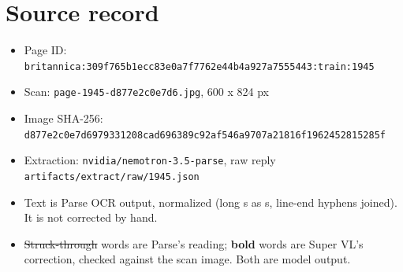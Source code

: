 \documentclass[10pt]{article}
\begin{document}
\section*{Source record}
\begin{itemize}
\item Page ID: \texttt{britannica:309f765b1ecc83e0a7f7762e44b4a927a7555443:train:1945}
\item Scan: \texttt{page-1945-d877e2c0e7d6.jpg}, 600 x 824 px
\item Image SHA-256: \texttt{\small d877e2c0e7d6979331208cad696389c92af546a9707a21816f1962452815285f}
\item Extraction: \texttt{nvidia/nemotron-3.5-parse}, raw reply \texttt{artifacts/extract/raw/1945.json}
\item Text is Parse OCR output, normalized (long s as s, line-end hyphens joined). It is not corrected by hand.
\item \sout{Struck-through} words are Parse's reading; \textbf{bold} words are Super VL's correction, checked against the scan image. Both are model output.
\end{itemize}
\end{document}
